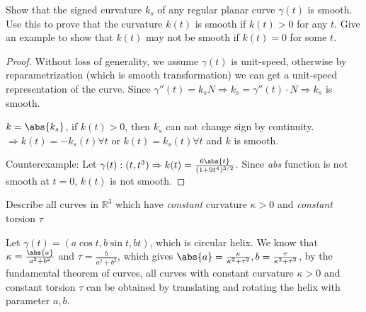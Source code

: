 \begin{problem}
Show that the signed curvature $k_s$ of any regular planar curve $\gamma(t)$ is smooth. Use this to prove that the curvature $k(t)$ is smooth if $k(t)>0$ for any $t$. Give an example to show that $k(t)$ may not be smooth if $k(t)=0$ for some $t$.
\end{problem}
\begin{solution}
    \begin{proof}
    Without loss of generality, we assume $\gamma(t)$ is unit-speed, otherwise by reparametrization (which is smooth transformation) we can get a unit-speed representation of the curve.
    Since $\gamma''(t) = k_s N \Rightarrow k_s = \gamma''(t) \cdot N \Rightarrow k_s $ is smooth.
    
    $k=\abs{k_s}$, if $k(t)>0$, then $k_s$ can not change sign by continuity.$\Rightarrow k(t)=-k_s(t)\forall t$ or $k(t)=k_s(t)\forall t$ and $k$ is smooth.
    
    Counterexample: Let $\gamma(t):(t,t^3)\Rightarrow k(t)=\frac{6\abs{t}}{(1+9t^4)^{3/2}}$. Since \textit{abs} function is not smooth at $t=0$, $k(t)$ is not smooth.
    \end{proof}
\end{solution}    

\begin{problem}
Describe all curves in $\mathbb{R}^3$ which have \textit{constant} curvature $\kappa>0$ and \textit{constant} torsion $\tau$
\end{problem}
\begin{solution}
    Let $\gamma(t) = (a\cos t, b\sin t, bt)$, which is circular helix. We know that $\kappa = \frac{\abs{a}}{a^2+b^2}$ and $\tau = \frac{b}{a^2+b^2}$, which gives $ \abs{a}=\frac{\kappa}{\kappa^2+\tau^2},b=\frac{\tau}{\kappa^2+\tau^2}$, by the fundamental theorem of curves, all curves with constant curvature $\kappa>0$ and constant torsion $\tau$ can be obtained by translating and rotating the helix with parameter $a,b$.
\end{solution}
    
